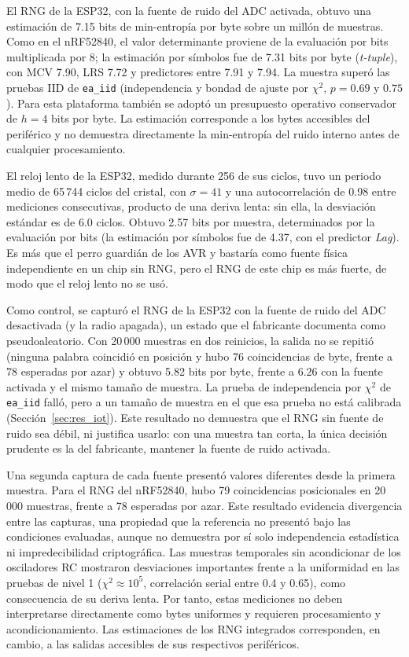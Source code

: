 El RNG de la ESP32, con la fuente de ruido del ADC activada, obtuvo una estimación de 7.15 bits de min-entropía por byte sobre un millón de muestras. Como en el nRF52840, el valor determinante proviene de la evaluación por bits multiplicada por 8; la estimación por símbolos fue de 7.31 bits por byte (\textit{t-tuple}), con MCV 7.90, LRS 7.72 y predictores entre 7.91 y 7.94. La muestra superó las pruebas IID de \texttt{ea\_iid} (independencia y bondad de ajuste por $\chi^2$, $p = 0.69$ y $0.75$). Para esta plataforma también se adoptó un presupuesto operativo conservador de $h=4$ bits por byte. La estimación corresponde a los bytes accesibles del periférico y no demuestra directamente la min-entropía del ruido interno antes de cualquier procesamiento.

El reloj lento de la ESP32, medido durante 256 de sus ciclos, tuvo un periodo medio de 65\,744 ciclos del cristal, con $\sigma = 41$ y una autocorrelación de 0.98 entre mediciones consecutivas, producto de una deriva lenta: sin ella, la desviación estándar es de 6.0 ciclos. Obtuvo 2.57 bits por muestra, determinados por la evaluación por bits (la estimación por símbolos fue de 4.37, con el predictor \textit{Lag}). Es más que el perro guardián de los AVR y bastaría como fuente física independiente en un chip sin RNG, pero el RNG de este chip es más fuerte, de modo que el reloj lento no se usó.

Como control, se capturó el RNG de la ESP32 con la fuente de ruido del ADC desactivada (y la radio apagada), un estado que el fabricante documenta como pseudoaleatorio. Con 20\,000 muestras en dos reinicios, la salida no se repitió (ninguna palabra coincidió en posición y hubo 76 coincidencias de byte, frente a 78 esperadas por azar) y obtuvo 5.82 bits por byte, frente a 6.26 con la fuente activada y el mismo tamaño de muestra. La prueba de independencia por $\chi^2$ de \texttt{ea\_iid} falló, pero a un tamaño de muestra en el que esa prueba no está calibrada (Sección~\ref{sec:res_iot}). Este resultado no demuestra que el RNG sin fuente de ruido sea débil, ni justifica usarlo: con una muestra tan corta, la única decisión prudente es la del fabricante, mantener la fuente de ruido activada.

Una segunda captura de cada fuente presentó valores diferentes desde la primera muestra. Para el RNG del nRF52840, hubo 79 coincidencias posicionales en 20\,000 muestras, frente a 78 esperadas por azar. Este resultado evidencia divergencia entre las capturas, una propiedad que la referencia no presentó bajo las condiciones evaluadas, aunque no demuestra por sí solo independencia estadística ni impredecibilidad criptográfica. Las muestras temporales sin acondicionar de los osciladores RC mostraron desviaciones importantes frente a la uniformidad en las pruebas de nivel 1 ($\chi^2 \approx 10^5$, correlación serial entre 0.4 y 0.65), como consecuencia de su deriva lenta. Por tanto, estas mediciones no deben interpretarse directamente como bytes uniformes y requieren procesamiento y acondicionamiento. Las estimaciones de los RNG integrados corresponden, en cambio, a las salidas accesibles de sus respectivos periféricos.

